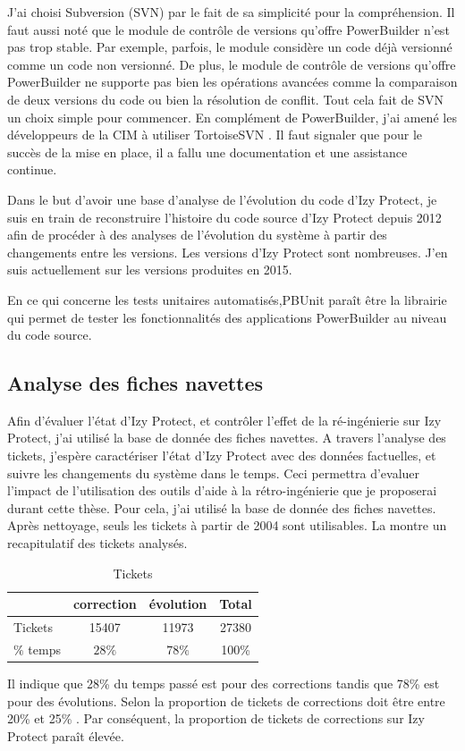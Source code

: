 \documentclass[a4paper]{article}
\begin{document}
J'ai choisi Subversion (SVN) \cite{svn} par le fait de sa simplicité pour la compréhension.
Il faut aussi noté que le module de contrôle de versions qu'offre PowerBuilder n'est pas trop stable. 
Par exemple, parfois, le module considère un code déjà versionné comme un code non versionné.
De plus, le module de contrôle de versions qu'offre PowerBuilder ne supporte pas bien les opérations avancées comme la comparaison de deux versions du code ou bien la résolution de conflit. 
Tout cela fait de SVN un choix simple pour commencer.
En complément de PowerBuilder, j'ai amené les développeurs de la CIM à utiliser TortoiseSVN \cite{clientSvn}.
Il faut signaler que pour le succès de la mise en place, il a fallu une documentation et une assistance continue.

Dans le but d'avoir une base d'analyse de l'évolution du code d'Izy Protect, je suis en train de  reconstruire l'histoire du code source d'Izy Protect depuis 2012 afin de procéder à des analyses de l'évolution du système à partir des changements entre les versions. 
Les versions d'Izy Protect sont nombreuses. J'en suis actuellement sur les versions produites en 2015.

En ce qui concerne les tests unitaires automatisés,PBUnit\cite{pbUnit}  paraît être la librairie qui permet de tester les fonctionnalités des applications PowerBuilder au niveau du code source. 


\subsection{Analyse des fiches navettes}
\label{sec:analyseDesFichesNavettes}
Afin d’évaluer l’état d’Izy Protect, et contrôler l’effet de la ré-ingénierie sur Izy Protect, j’ai utilisé la base de donnée des fiches navettes.
A travers l'analyse des tickets, j'espère  caractériser l'état d'Izy Protect avec des données factuelles, 
et suivre  les changements du système dans le temps.
Ceci permettra  d'evaluer l'impact de l'utilisation des outils d'aide à la rétro-ingénierie que je proposerai durant cette thèse.
Pour cela, j'ai utilisé la base de donnée des fiches navettes. 
Après nettoyage, seuls les tickets à partir de 2004 sont utilisables.
 La  montre un recapitulatif des tickets analysés.  
\begin{table}[htbp]
  \begin{center}
    \caption{Tickets}
    \label{tab:proportion}
    \begin{tabular}{| l | c |c|c|}
      \hline
       & correction  & évolution  & Total\\
      \hline
      Tickets &15407 & 11973  & 27380\\
      \hline
      $\%$ temps & $28\%$ & $78\%$ & 100\% \\
      \hline 
    \end{tabular}
  \end{center}  
\end{table}
Il indique que 28\% du temps passé est pour des corrections tandis que 78\% est  pour des évolutions.
Selon \citet{Pigo96a} la proportion de tickets de corrections doit être entre 20\% et 25\% . 
Par conséquent, la proportion de tickets de corrections sur Izy Protect paraît élevée.
\end{document}
